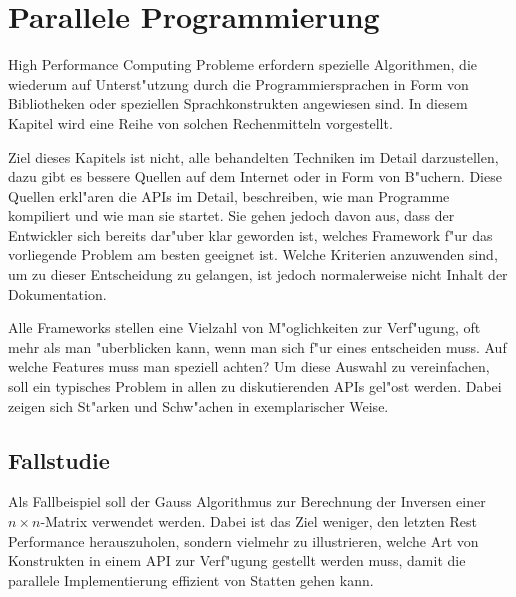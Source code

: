 \chapter{Parallele Programmierung}
High Performance Computing Probleme erfordern spezielle Algorithmen, die
wiederum auf Unterst"utzung durch die Programmiersprachen in Form von
Bibliotheken oder speziellen Sprachkonstrukten angewiesen sind.
In diesem Kapitel wird eine Reihe von solchen Rechenmitteln vorgestellt.

Ziel dieses Kapitels ist nicht, alle behandelten Techniken im Detail
darzustellen, dazu gibt es bessere Quellen auf dem Internet oder in
Form von B"uchern.
Diese Quellen erkl"aren die APIs im Detail, beschreiben, wie man Programme
kompiliert und wie man sie startet. Sie gehen jedoch davon aus, dass der
Entwickler sich bereits dar"uber klar geworden ist, welches Framework
f"ur das vorliegende Problem am besten geeignet ist.
Welche Kriterien anzuwenden sind, um zu dieser Entscheidung zu gelangen,
ist jedoch normalerweise nicht Inhalt der Dokumentation.

Alle Frameworks stellen eine Vielzahl von M"oglichkeiten zur
Verf"ugung, oft mehr als man "uberblicken kann, wenn man sich f"ur
eines entscheiden muss.
Auf welche Features muss man speziell achten? Um diese Auswahl
zu vereinfachen, soll ein typisches Problem in allen zu diskutierenden
APIs gel"ost werden. Dabei zeigen sich St"arken und Schw"achen  in
exemplarischer Weise.

\section{Fallstudie}
Als Fallbeispiel soll der Gauss Algorithmus zur Berechnung der Inversen
einer $n\times n$-Matrix verwendet werden. Dabei ist das Ziel weniger,
den letzten Rest Performance herauszuholen, sondern vielmehr zu
illustrieren, welche Art von Konstrukten in einem API zur Verf"ugung
gestellt werden muss, damit die parallele Implementierung effizient
von Statten gehen kann.

